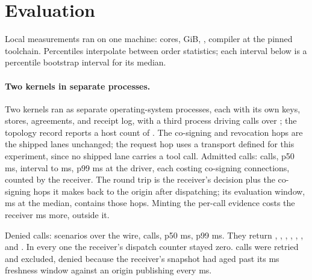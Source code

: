 \section{Evaluation}
\label{sec:eval}

Local measurements ran on one machine: \PSHostCores{} \PSHostCpuModel{} cores,
\PSHostMemoryGiB{} GiB, \PSHostOs{}, compiler \PSRustcVersion{} at the pinned
toolchain. Percentiles interpolate between order statistics; each interval
below is a percentile bootstrap interval for its median.

\paragraph{Two kernels in separate processes.}
Two kernels ran as separate operating-system processes, each with its own keys,
stores, agreements, and receipt log, with a third process driving calls over
\PSFedTransport{}; the topology record reports a host count of \PSFedHosts{}.
The co-signing and revocation hops are the shipped lanes unchanged; the request
hop uses a transport defined for this experiment, since no shipped lane carries
a tool call. Admitted calls: \PSFedAllowSampleCount{}
calls, p50 \PSFedAllowPFiftyMs{} ms, interval \PSFedAllowCiLowMs{} to
\PSFedAllowCiHighMs{} ms, p99 \PSFedAllowPNinetyNineMs{} ms at the driver, each
costing \PSFedCosignConnections{} co-signing connections, counted by the
receiver. The round trip is the receiver's decision plus the co-signing hops it
makes back to the origin after dispatching; its evaluation window,
\PSFedReceiverEvalPFiftyMs{} ms at the median, contains those hops. Minting the
per-call evidence costs the receiver \PSFedEvidencePrepPFiftyMs{} ms more,
outside it.

Denied calls: \PSFedDenyCases{} scenarios over the wire,
\PSFedDenySampleCount{} calls, p50 \PSFedDenyPFiftyMs{} ms, p99
\PSFedDenyPNinetyNineMs{} ms. They return ,
,
,
,
,
, and
. In every one the receiver's dispatch
counter stayed zero. \PSFedAbsorbedCount{} calls were retried and excluded, denied because the receiver's snapshot had aged past its
\PSFreshnessMs{} ms freshness window against an origin publishing every
\PSEpochTickMs{} ms.

